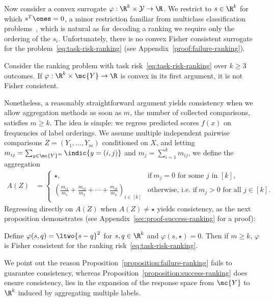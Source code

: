 \documentclass[11pt]{article}
\newcommand{\sloss}{\varphi}  %
\begin{document}
Now consider a convex surrogate $\sloss: \R^k \times \mathcal{Y} \to
\R$.
%
We restrict to $s \in \R^k$ for which $s^T\ones = 0$, a
minor restriction familiar from multiclass classification
problems~\citep{Zhang04a,TewariBa07}, which is natural as for decoding a
ranking we require only the ordering of the $s_i$.
%
Unfortunately, there is no convex Fisher consistent surrogate for the
problem~\eqref{eq:task-risk-ranking} (see
Appendix~\ref{proof:failure-ranking}).
\begin{proposition}
  \label{proposition:failure-ranking}
  Consider the ranking problem with task risk~\eqref{eq:task-risk-ranking}
  over $k \ge 3$ outcomes.
  If $\sloss : \R^k \times \mc{Y} \to \R$ is convex in its first argument,
  it is not Fisher consistent.
\end{proposition}

Nonetheless, a reasonably straightforward argument yields consistency when
we allow aggregation methods as soon as $m$, the number of collected
comparisons, satisfies $m \ge k$.
%
The idea is simple: we regress predicted scores $f(x)$ on frequencies
of label orderings.
%
We assume multiple independent pairwise comparisons $Z = (Y_1, \ldots, Y_m)$
conditioned on $X$, and letting $m_{ij} = \sum_{y \in \mc{Y}^m} \indic{y =
  (i,j)}$ and $m_j = \sum_{i = 1}^k m_{ij}$, we define
the aggregation
\begin{align*}
  A(Z) & = \begin{cases}
    \star, & \mbox{if} ~ m_j = 0 \text{ for some }j\text{ in }[k], \\
    (\frac{m_{i1}}{m_1} + \frac{m_{i2}}{m_2} + \cdots + \frac{m_{ik}}{m_k})_{
      i \in [k]}
    & \mbox{otherwise, i.e.~if}~ m_j > 0 \text{ for all }j \in [k].
  \end{cases}
\end{align*}
Regressing directly on $A(Z)$ when $A(Z) \neq \star$ yields consistency, as
the next proposition demonstrates (see
Appendix~\ref{sec:proof-success-ranking} for a proof):
\begin{proposition}
  \label{proposition:success-ranking}
  Define $\sloss(s, q) = \ltwo{s - q}^2$ for $s, q \in \R^k$ and
  $\sloss(s, \star) = 0$.
  Then if $m \ge k$, $\sloss$ is Fisher consistent
  for the ranking risk~\eqref{eq:task-risk-ranking}.
\end{proposition}
We point out the reason Proposition~\ref{proposition:failure-ranking} fails to guarantee consistency, whereas Proposition~\ref{proposition:success-ranking} does ensure consistency, lies in the expansion of the response space from $\mc{Y}$ to $\R^k$ induced by aggregating multiple labels.
\end{document}
